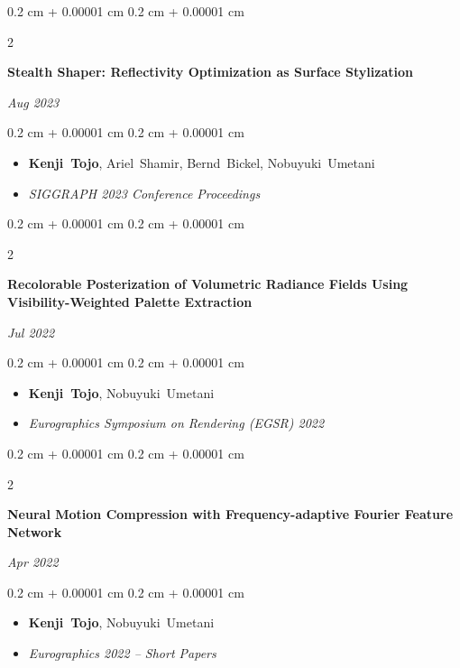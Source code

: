 \documentclass[10pt, letterpaper]{article}
\newenvironment{highlights}{
    \begin{itemize}[
        topsep=0.10 cm,
        parsep=0.10 cm,
        partopsep=0pt,
        itemsep=0pt,
        leftmargin=0.4 cm + 10pt
    ]
}{
    \end{itemize}
} %
\newenvironment{onecolentry}{
    \begin{adjustwidth}{
        0.2 cm + 0.00001 cm
    }{
        0.2 cm + 0.00001 cm
    }
}{
    \end{adjustwidth}
} %
\newenvironment{shorttwocolentry}[2][]{
    \onecolentry
    \def\secondColumn{#2}
    \setcolumnwidth{\fill, 2.5 cm}
    \begin{paracol}{2}
}{
    \switchcolumn \raggedleft \secondColumn
    \end{paracol}
    \endonecolentry
} %
\begin{document}
        \vspace{0.20 cm}
        \begin{samepage}
            \begin{shorttwocolentry}{\textit{Aug 2023}}
                \textbf{Stealth Shaper: Reflectivity Optimization as Surface Stylization}
            \end{shorttwocolentry}
            \vspace{0.10 cm}
            \begin{onecolentry}
            \begin{highlights}
                    \item \mbox{\textbf{Kenji Tojo}}, \mbox{Ariel Shamir}, \mbox{Bernd Bickel}, \mbox{Nobuyuki Umetani}
                    \item \textit{SIGGRAPH 2023 Conference Proceedings}
            \end{highlights}
            \end{onecolentry}
        \end{samepage}

        \vspace{0.20 cm}
        \begin{samepage}
            \begin{shorttwocolentry}{\textit{Jul 2022}}
                \textbf{Recolorable Posterization of Volumetric Radiance Fields Using Visibility-Weighted Palette Extraction}
            \end{shorttwocolentry}
            \vspace{0.10 cm}
            \begin{onecolentry}
            \begin{highlights}
                    \item \mbox{\textbf{Kenji Tojo}}, \mbox{Nobuyuki Umetani}
                    \item \textit{Eurographics Symposium on Rendering (EGSR) 2022}
            \end{highlights}
            \end{onecolentry}
        \end{samepage}

        \vspace{0.20 cm}
        \begin{samepage}
            \begin{shorttwocolentry}{\textit{Apr 2022}}
                \textbf{Neural Motion Compression with Frequency-adaptive Fourier Feature Network}
            \end{shorttwocolentry}
            \vspace{0.10 cm}
            \begin{onecolentry}
            \begin{highlights}
                    \item \mbox{\textbf{Kenji Tojo}}, \mbox{Nobuyuki Umetani}
                    \item \textit{Eurographics 2022 -- Short Papers}
            \end{highlights}
            \end{onecolentry}
        \end{samepage}
\end{document}
